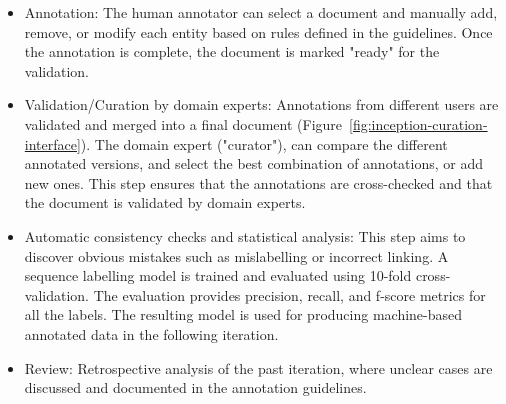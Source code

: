 \documentclass[]{interact}
\theoremstyle{plain}%
\theoremstyle{definition}
\theoremstyle{remark}
\begin{document}
\begin{itemize}
\item Annotation: The human annotator can select a document and manually add, remove, or modify each entity based on rules defined in the guidelines. Once the annotation is complete, the document is marked "ready" for the validation. 

\item Validation/Curation by domain experts: Annotations from different users are validated and merged into a final document (Figure~\ref{fig:inception-curation-interface}). 
The domain expert ("curator"), can compare the different annotated versions, and select the best combination of annotations, or add new ones. 
This step ensures that the annotations are cross-checked and that the document is validated by domain experts.

\item Automatic consistency checks and statistical analysis: This step aims to discover obvious mistakes such as mislabelling or incorrect linking. 
A sequence labelling model is trained and evaluated using 10-fold cross-validation. The evaluation provides precision, recall, and f-score metrics for all the labels.
The resulting model is used for producing machine-based annotated data in the following iteration.

\item Review: Retrospective analysis of the past iteration, where unclear cases are discussed and documented in the annotation guidelines. 

\end{itemize}
\end{document}
